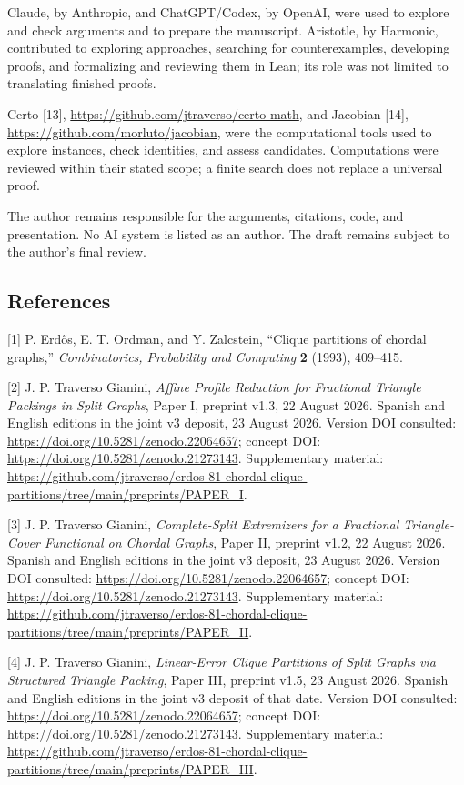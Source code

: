 \documentclass[english,11pt,a4paper]{article}
\begin{document}
Claude, by Anthropic, and ChatGPT/Codex, by OpenAI, were used to explore and check arguments and to prepare the manuscript. Aristotle, by Harmonic, contributed to exploring approaches, searching for counterexamples, developing proofs, and formalizing and reviewing them in Lean; its role was not limited to translating finished proofs.

Certo {[}13{]}, \url{https://github.com/jtraverso/certo-math}, and Jacobian {[}14{]}, \url{https://github.com/morluto/jacobian}, were the computational tools used to explore instances, check identities, and assess candidates. Computations were reviewed within their stated scope; a finite search does not replace a universal proof.

The author remains responsible for the arguments, citations, code, and presentation. No AI system is listed as an author. The draft remains subject to the author's final review.

\clearpage
\subsection{References}
\begingroup\small\setlength{\parskip}{4pt}\label{references}

{[}1{]} P. Erdős, E. T. Ordman, and Y. Zalcstein, ``Clique partitions of chordal graphs,'' \emph{Combinatorics, Probability and Computing} \textbf{2} (1993), 409--415.

{[}2{]} J. P. Traverso Gianini, \emph{Affine Profile Reduction for Fractional Triangle Packings in Split Graphs}, Paper I, preprint v1.3, 22 August 2026. Spanish and English editions in the joint v3 deposit, 23 August 2026. Version DOI consulted: \url{https://doi.org/10.5281/zenodo.22064657}; concept DOI: \url{https://doi.org/10.5281/zenodo.21273143}. Supplementary material: \url{https://github.com/jtraverso/erdos-81-chordal-clique-partitions/tree/main/preprints/PAPER_I}.

{[}3{]} J. P. Traverso Gianini, \emph{Complete-Split Extremizers for a Fractional Triangle-Cover Functional on Chordal Graphs}, Paper II, preprint v1.2, 22 August 2026. Spanish and English editions in the joint v3 deposit, 23 August 2026. Version DOI consulted: \url{https://doi.org/10.5281/zenodo.22064657}; concept DOI: \url{https://doi.org/10.5281/zenodo.21273143}. Supplementary material: \url{https://github.com/jtraverso/erdos-81-chordal-clique-partitions/tree/main/preprints/PAPER_II}.

{[}4{]} J. P. Traverso Gianini, \emph{Linear-Error Clique Partitions of Split Graphs via Structured Triangle Packing}, Paper III, preprint v1.5, 23 August 2026. Spanish and English editions in the joint v3 deposit of that date. Version DOI consulted: \url{https://doi.org/10.5281/zenodo.22064657}; concept DOI: \url{https://doi.org/10.5281/zenodo.21273143}. Supplementary material: \url{https://github.com/jtraverso/erdos-81-chordal-clique-partitions/tree/main/preprints/PAPER_III}.
\end{document}
